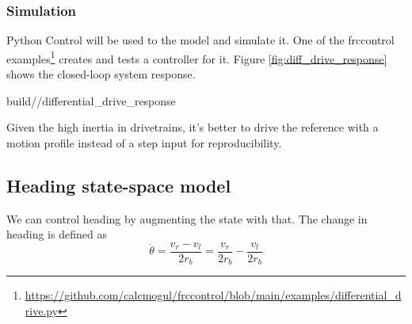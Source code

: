 \subsubsection{Simulation}

Python Control will be used to  the
\gls{model} and simulate it. One of the frccontrol
examples\footnote{\url{https://github.com/calcmogul/frccontrol/blob/main/examples/differential_drive.py}}
creates and tests a controller for it. Figure \ref{fig:diff_drive_response}
shows the closed-loop \gls{system} response.
\begin{svg}{build/\chapterpath/differential_drive_response}
  \caption{Drivetrain response}
  \label{fig:diff_drive_response}
\end{svg}

Given the high inertia in drivetrains, it's better to drive the \gls{reference}
with a motion profile instead of a \gls{step input} for reproducibility.

\subsection{Heading state-space model}

We can control heading by augmenting the state with that. The change in heading
is defined as
\begin{equation*}
  \dot{\theta} = \frac{v_r - v_l}{2r_b} = \frac{v_r}{2r_b} - \frac{v_l}{2r_b}
\end{equation*}

